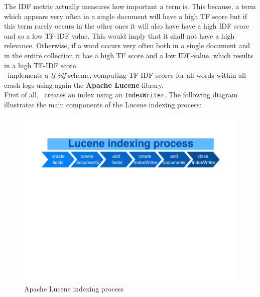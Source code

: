 The IDF metric actually measures how important a term is. This because, a term which appears very often in a single document will have a high TF score but if this term rarely occurs in the other ones it will also have have a high IDF score and so a low TF-IDF value. This would imply that it shall not have a high relevance. Otherwise, if a word occurs very often both in a single document and in the entire collection it has a high TF score and a low IDF-value, which results in a high TF-IDF score. \\

\toolname\ implements a \textit{tf-idf} scheme, computing TF-IDF scores for all words within all crash logs using again the \textbf{Apache Lucene} library. \\
First of all, \toolname\ creates an index using an \texttt{IndexWriter}. The following diagram illustrates the main components of the Lucene indexing process:
\begin{figure}[tb]
\centering 
\includegraphics[width=\columnwidth]{diagrams/indexingProcess} 
\caption{Apache Lucene indexing process}
\label{fig: indexingprocess}
\end{figure}

